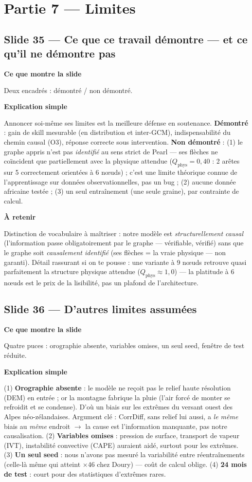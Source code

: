 \documentclass[11pt,a4paper]{article}
\newcommand{\slide}[2]{\subsection*{\textcolor{bleu}{Slide #1 --- #2}}}
\newcommand{\bloc}[1]{\par\medskip\noindent\textcolor{accent}{\textbf{#1}}\par\nopagebreak\smallskip}
\begin{document}
\section{Partie 7 --- Limites}

\slide{35}{Ce que ce travail démontre --- et ce qu'il ne démontre pas}

\bloc{Ce que montre la slide}
Deux encadrés : démontré / non démontré.

\bloc{Explication simple}
Annoncer soi-même ses limites est la meilleure défense en soutenance. \textbf{Démontré} : gain de skill mesurable (en distribution et inter-GCM), indispensabilité du chemin causal (O3), réponse correcte sous intervention. \textbf{Non démontré} : (1) le graphe appris n'est pas \emph{identifié} au sens strict de Pearl --- ses flèches ne coïncident que partiellement avec la physique attendue ($Q_{\mathrm{phys}} = 0{,}40$ : 2 arêtes sur 5 correctement orientées à 6 n\oe uds) ; c'est une limite théorique connue de l'apprentissage sur données observationnelles, pas un bug ; (2) aucune donnée africaine testée ; (3) un seul entraînement (une seule graine), par contrainte de calcul.

\bloc{À retenir}
Distinction de vocabulaire à maîtriser : notre modèle est \emph{structurellement causal} (l'information passe obligatoirement par le graphe --- vérifiable, vérifié) sans que le graphe soit \emph{causalement identifié} (ses flèches = la vraie physique --- non garanti). Détail rassurant si on te pousse : une variante à 9 n\oe uds retrouve quasi parfaitement la structure physique attendue ($Q_{\mathrm{phys}} \approx 1{,}0$) --- la platitude à 6 n\oe uds est le prix de la lisibilité, pas un plafond de l'architecture.

\slide{36}{D'autres limites assumées}

\bloc{Ce que montre la slide}
Quatre puces : orographie absente, variables omises, un seul seed, fenêtre de test réduite.

\bloc{Explication simple}
(1) \textbf{Orographie absente} : le modèle ne reçoit pas le relief haute résolution (DEM) en entrée ; or la montagne fabrique la pluie (l'air forcé de monter se refroidit et se condense). D'où un biais sur les extrêmes du versant ouest des Alpes néo-zélandaises. Argument clé : CorrDiff, sans relief lui aussi, a \emph{le même} biais au \emph{même} endroit $\to$ la cause est l'information manquante, pas notre causalisation. (2) \textbf{Variables omises} : pression de surface, transport de vapeur (IVT), instabilité convective (CAPE) auraient aidé, surtout pour les extrêmes. (3) \textbf{Un seul seed} : nous n'avons pas mesuré la variabilité entre réentraînements (celle-là même qui atteint $\times$46 chez Doury) --- coût de calcul oblige. (4) \textbf{24 mois de test} : court pour des statistiques d'extrêmes rares.
\end{document}
